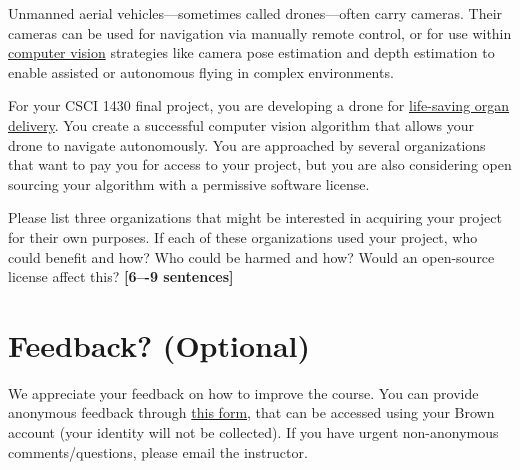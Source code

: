 \documentclass{csci1430}
\begin{document}
\pagebreak

\begin{subquestion}[points=4,drawbox=false]
Unmanned aerial vehicles---sometimes called drones---often carry cameras. Their cameras can be used for navigation via manually remote control, or for use within \href{https://link.springer.com/article/10.1007/s10846-017-0483-z}{computer vision} strategies like camera pose estimation and depth estimation to enable assisted or autonomous flying in complex environments.

For your CSCI 1430 final project, you are developing a drone for \href{https://www.cnn.com/2019/05/01/health/drone-organ-transplant-bn-trnd/index.html}{life-saving organ delivery}. You create a successful computer vision algorithm that allows your drone to navigate autonomously. You are approached by several organizations that want to pay you for access to your project, but you are also considering open sourcing your algorithm with a permissive software license.
\end{subquestion}

\begin{orangebox}
Please list three organizations that might be interested in acquiring your project for their own purposes. If each of these organizations used your project, who could benefit and how? Who could be harmed and how? Would an open-source license affect this? \textbf{[6–-9 sentences]}
\end{orangebox}

\begin{answer}[height=28]
\end{answer}


\pagebreak

\section*{Feedback? (Optional)}
We appreciate your feedback on how to improve the course. You can provide anonymous feedback through \href{https://forms.gle/Eu5jJbDUmLknAyJV9}{this form}, that can be accessed using your Brown account (your identity will not be collected). If you have urgent non-anonymous comments/questions, please email the instructor.
\end{document}
